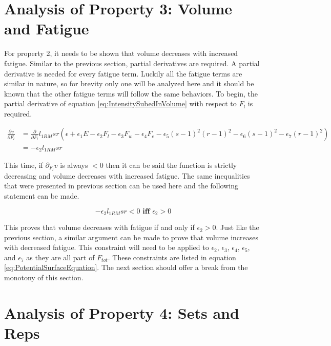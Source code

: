 \section{Analysis of Property 3: Volume and Fatigue}
\label{sec:PotentialSurfaceAnalysisOfProperty3}

For property 2, it needs to be shown that volume decreases with increased fatigue. Similar to the previous section, partial derivatives are required. A partial derivative is needed for every fatigue term. Luckily all the fatigue terms are similar in nature, so for brevity only one will be analyzed here and it should be known that the other fatigue terms will follow the same behaviors. To begin, the partial derivative of equation \ref{eq:IntensitySubedInVolume} with respect to $F_l$ is required.

\begin{equation*}
    \begin{split}
    		\frac{\partial v}{\partial F_l} & =
    		\frac{\partial}{\partial F_l} l_{1RM} sr\left( 
    			\epsilon+
    			\epsilon_1 E-
    			\epsilon_2 F_l-
    			\epsilon_3 F_w-
    			\epsilon_4 F_e-
    			\epsilon_5(s-1)^2(r-1)^2-
    			\epsilon_6(s-1)^2-
    			\epsilon_7(r-1)^2
    		\right) \\
    		& = -\epsilon_2 l_{1RM} sr
    \end{split}
\end{equation*}

This time, if $\partial_{F_l}v$ is always $<0$ then it can be said the function is strictly decreasing and volume decreases with increased fatigue. The same inequalities that were presented in previous section can be used here and the following statement can be made.

\begin{equation*}
    -\epsilon_2 l_{1RM} sr< 0 \textbf{ iff } \epsilon_2> 0
\end{equation*}

This proves that volume decreases with fatigue if and only if $\epsilon_2>0$. Just like the previous section, a similar argument can be made to prove that volume increases with decreased fatigue. This constraint will need to be applied to $\epsilon_2$, $\epsilon_3$, $\epsilon_4$, $\epsilon_5$, and $\epsilon_7$ as they are all part of $F_{tot}$. These constraints are listed in equation \ref{eq:PotentialSurfaceEquation}. The next section should offer a break from the monotony of this section.

\section{Analysis of Property 4: Sets and Reps}
\label{sec:PotentialSurfaceAnalysisOfProperty4}

